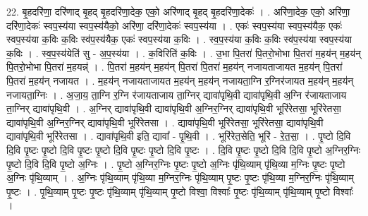 \documentclass[17pt]{extarticle}
\begin{document}
22. बृ॒हदरि॑णा॒ दरि॑णाद् बृ॒हद् बृ॒हदरि॑णा॒देक॒ एको॒ अरि॑णाद् बृ॒हद् बृ॒हदरि॑णा॒देकः॑ । . अरि॑णा॒देक॒ एको॒ अरि॑णा॒ दरि॑णा॒देकः॑ स्वप॒स्य॑या स्वप॒स्य॑यैको॒ अरि॑णा॒ दरि॑णा॒देकः॑ स्वप॒स्य॑या । . एकः॑ स्वप॒स्य॑या स्वप॒स्य॑यैक॒ एकः॑ स्वप॒स्य॑या क॒विः क॒विः स्व॑प॒स्य॑यैक॒ एकः॑ स्वप॒स्य॑या क॒विः । . स्व॒प॒स्य॑या क॒विः क॒विः स्व॑प॒स्य॑या स्वप॒स्य॑या क॒विः । . स्व॒प॒स्य॑येति॑ सु - अ॒प॒स्य॑या । . क॒विरिति॑ क॒विः । . उ॒भा पि॒तरा॑ पि॒तरो॒भोभा पि॒तरा॑ म॒हय॑न् म॒हय॑न् पि॒तरो॒भोभा पि॒तरा॑ म॒हयन्न्॑ । . पि॒तरा॑ म॒हय॑न् म॒हय॑न् पि॒तरा॑ पि॒तरा॑ म॒हय॑न् नजायताजायत म॒हय॑न् पि॒तरा॑ पि॒तरा॑ म॒हय॑न् नजायत । . म॒हय॑न् नजायताजायत म॒हय॑न् म॒हय॑न् नजायता॒ग्नि र॒ग्निर॑जायत म॒हय॑न् म॒हय॑न् नजायता॒ग्निः । . अ॒जा॒य॒ ता॒ग्नि र॒ग्नि र॑जायताजाय ता॒ग्निर् द्यावा॑पृथि॒वी द्यावा॑पृथि॒वी अ॒ग्नि र॑जायताजाय ता॒ग्निर् द्यावा॑पृथि॒वी । . अ॒ग्निर् द्यावा॑पृथि॒वी द्यावा॑पृथि॒वी अ॒ग्निर॒ग्निर् द्यावा॑पृथि॒वी भूरि॑रेतसा॒ भूरि॑रेतसा॒ द्यावा॑पृथि॒वी अ॒ग्निर॒ग्निर् द्यावा॑पृथि॒वी भूरि॑रेतसा । . द्यावा॑पृथि॒वी भूरि॑रेतसा॒ भूरि॑रेतसा॒ द्यावा॑पृथि॒वी द्यावा॑पृथि॒वी भूरि॑रेतसा । . द्यावा॑पृथि॒वी इति॒ द्यावा᳚ - पृ॒थि॒वी । . भूरि॑रेत॒सेति॒ भूरि॑ - रे॒त॒सा॒ । . पृ॒ष्टो दि॒वि दि॒वि पृ॒ष्टः पृ॒ष्टो दि॒वि पृ॒ष्टः पृ॒ष्टो दि॒वि पृ॒ष्टः पृ॒ष्टो दि॒वि पृ॒ष्टः । . दि॒वि पृ॒ष्टः पृ॒ष्टो दि॒वि दि॒वि पृ॒ष्टो अ॒ग्निर॒ग्निः पृ॒ष्टो दि॒वि दि॒वि पृ॒ष्टो अ॒ग्निः । . पृ॒ष्टो अ॒ग्निर॒ग्निः पृ॒ष्टः पृ॒ष्टो अ॒ग्निः पृ॑थि॒व्याम् पृ॑थि॒व्या म॒ग्निः पृ॒ष्टः पृ॒ष्टो अ॒ग्निः पृ॑थि॒व्याम् । . अ॒ग्निः पृ॑थि॒व्याम् पृ॑थि॒व्या म॒ग्निर॒ग्निः पृ॑थि॒व्याम् पृ॒ष्टः पृ॒ष्टः पृ॑थि॒व्या म॒ग्निर॒ग्निः पृ॑थि॒व्याम् पृ॒ष्टः । . पृ॒थि॒व्याम् पृ॒ष्टः पृ॒ष्टः पृ॑थि॒व्याम् पृ॑थि॒व्याम् पृ॒ष्टो विश्वा॒ विश्वाः᳚ पृ॒ष्टः पृ॑थि॒व्याम् पृ॑थि॒व्याम् पृ॒ष्टो विश्वाः᳚ । \newline
\end{document}
